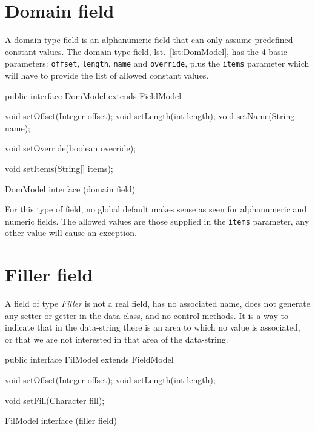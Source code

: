 \documentclass[a4paper,10pt]{report}
\newenvironment{elisting}[1][H]
  {\captionsetup{aboveskip=0pt}\begin{listing}[#1]}
  {\end{listing}%
}
\begin{document}
\section{Domain field}
A domain-type field is an alphanumeric field that can only assume predefined 
constant values. 
The domain type field, lst.~\ref{lst:DomModel}, has the 4 basic parameters: 
\verb!offset!, \verb!length!, \verb!name! and \verb!override!, plus the 
\verb!items! parameter which will have to provide the list of allowed constant 
values.

\begin{elisting}[!htb]
\begin{javacode}
public interface DomModel extends FieldModel {
    void setOffset(Integer offset);
    void setLength(int length);
    void setName(String name);
    
    void setOverride(boolean override);
    
    void setItems(String[] items);
}
\end{javacode}
\caption{DomModel interface (domain field)}
\label{lst:DomModel}
\end{elisting}

For this type of field, no global default makes sense as seen for alphanumeric 
and numeric fields. The allowed values are those supplied in the \verb!items! 
parameter, any other value will cause an exception.

\section{Filler field}
A field of type \textsl{Filler} is not a real field, has no associated name, 
does not generate any setter or getter in the data-class, and no control 
methods. It is a way to indicate that in the data-string there is an area to 
which no value is associated, or that we are not interested in that area of 
the data-string.

\begin{elisting}[!htb]
\begin{javacode}
public interface FilModel extends FieldModel {
    void setOffset(Integer offset);
    void setLength(int length);
    
    void setFill(Character fill);
}
\end{javacode}
\caption{FilModel interface (filler field)}
\label{lst:FilModel}
\end{elisting}
\end{document}
